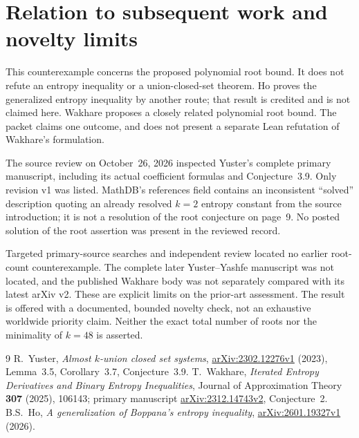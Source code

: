\documentclass[11pt]{article}
\begin{document}
\section{Relation to subsequent work and novelty limits}
This counterexample concerns the proposed polynomial root bound.
It does not refute an entropy inequality or a union-closed-set theorem.
Ho \cite{Ho} proves the generalized entropy inequality by another
route; that result is credited and is not claimed here. Wakhare
\cite[Conjecture~2]{Wakhare} proposes a closely related polynomial
root bound. The packet claims one outcome, and does not present a
separate Lean refutation of Wakhare's formulation.

The source review on October~26, 2026 inspected Yuster's complete
primary manuscript, including its actual coefficient formulas and
Conjecture~3.9. Only revision v1 was listed. MathDB's references field
contains an inconsistent ``solved'' description quoting an already
resolved $k=2$ entropy constant from the source introduction; it is not
a resolution of the root conjecture on page~9. No posted solution of
the root assertion was present in the reviewed record.

Targeted primary-source searches and independent review located no
earlier root-count counterexample. The complete later
Yuster--Yashfe manuscript was not located, and the published Wakhare
body was not separately compared with its latest arXiv v2. These are
explicit limits on the prior-art assessment. The result is offered
with a documented, bounded novelty check, not an exhaustive worldwide
priority claim. Neither the exact total number of roots nor the
minimality of $k=48$ is asserted.

\begin{thebibliography}{9}
R.~Yuster, \emph{Almost $k$-union closed set systems},
\href{https://arxiv.org/abs/2302.12276v1}{arXiv:2302.12276v1}
(2023), Lemma~3.5, Corollary~3.7, Conjecture~3.9.
T.~Wakhare, \emph{Iterated Entropy Derivatives and Binary Entropy
Inequalities}, Journal of Approximation Theory \textbf{307} (2025),
106143; primary manuscript
\href{https://arxiv.org/abs/2312.14743v2}{arXiv:2312.14743v2},
Conjecture~2.
B.S.~Ho, \emph{A generalization of Boppana's entropy inequality},
\href{https://arxiv.org/abs/2601.19327v1}{arXiv:2601.19327v1}
(2026).
\end{thebibliography}
\end{document}
